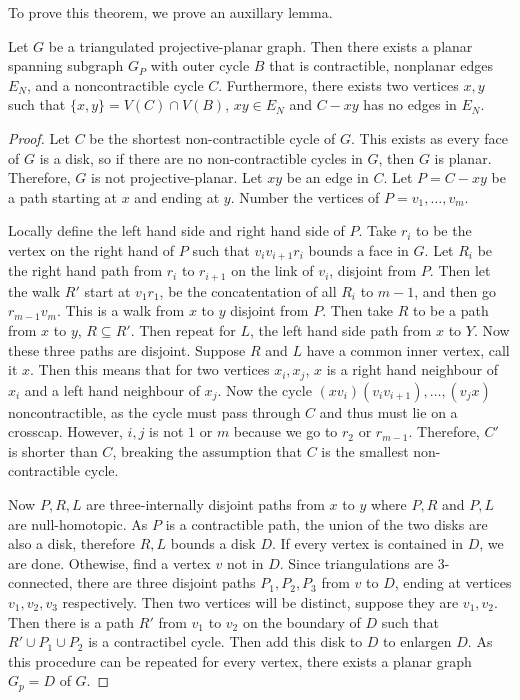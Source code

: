 To prove this theorem, we prove an auxillary lemma. 

\begin{lemma}\label{lem:proj_planar triangulation}
    Let $G$ be a triangulated projective-planar graph. Then there exists a planar spanning subgraph $G_P$ with outer cycle $B$ that is contractible, nonplanar edges $E_N$, and a noncontractible cycle $C$. Furthermore, there exists two vertices $x, y$ such that $\{x, y \} = V(C) \cap V(B)$, $xy \in E_N$ and $C - xy$ has no edges in $E_N$. 
\end{lemma}

\begin{proof}
    Let $C$ be the shortest non-contractible cycle of $G$. This exists as every face of $G$ is a disk, so if there are no non-contractible cycles in $G$, then $G$ is planar. Therefore, $G$ is not projective-planar. Let $xy$ be an edge in $C$. Let $P = C - xy$ be a path starting at $x$ and ending at $y$. 
    Number the vertices of $P = v_1, \ldots, v_m$. 

    Locally define the left hand side and right hand side of $P$. Take $r_i$ to be the vertex on the right hand of $P$ such that $v_i v_{i + 1} r_i$ bounds a face in $G$. Let $R_i$ be the right hand path from $r_i$ to $r_{i + 1}$ on the link of $v_i$, disjoint from $P$. Then let the walk $R'$ start at $v_1 r_1$, be the concatentation of all $R_i$ to $m-1$, and then go $r_{m-1} v_m$. This is a walk from $x$ to $y$ disjoint from $P$. Then take $R$ to be a path from $x$ to $y$, $R \subseteq R'$. Then repeat for $L$, the left hand side path from $x$ to $Y$. Now these three paths are disjoint. Suppose $R$ and $L$ have a common inner vertex, call it $x$. Then this means that for two vertices $x_i, x_j$, $x$ is a right hand neighbour of $x_i$ and a left hand neighbour of $x_j$. Now the cycle $(x v_i) (v_i v_{i + 1}), \ldots , (v_j x)$ noncontractible, as the cycle must pass through $C$ and thus must lie on a crosscap. However, $i, j$ is not $1$ or $m$ because we go to $r_2$ or $r_{m-1}$. Therefore, $C'$ is shorter than $C$, breaking the assumption that $C$ is the smallest non-contractible cycle.

    Now $P, R, L$ are three-internally disjoint paths from $x$ to $y$ where $P, R$ and $P, L$ are null-homotopic. As $P$ is a contractible path, the union of the two disks are also a disk, therefore $R, L$ bounds a disk $D$. If every vertex is contained in $D$, we are done. Othewise, find a vertex $v$ not in $D$. Since triangulations are 3-connected, there are three disjoint paths $P_1, P_2, P_3$ from $v$ to $D$, ending at vertices $v_1, v_2, v_3$ respectively. Then two vertices will be distinct, suppose they are $v_1, v_2$. Then there is a path $R'$ from $v_1$ to $v_2$ on the boundary of $D$ such that $R' \cup P_1 \cup P_2$ is a contractibel cycle. Then add this disk to $D$ to enlargen $D$. As this procedure can be repeated for every vertex, there exists a planar graph $G_p = D$ of $G$. 
\end{proof}

